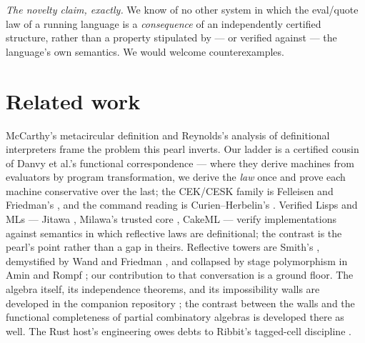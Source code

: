 \documentclass[acmsmall,screen,review]{acmart}
\begin{document}
\emph{The novelty claim, exactly.} We know of no other system in
which the eval/quote law of a running language is a
\emph{consequence} of an independently certified structure, rather
than a property stipulated by --- or verified against --- the
language's own semantics. We would welcome counterexamples.

\section{Related work}
\label{sec:related}

McCarthy's metacircular definition \cite{mccarthy60} and Reynolds's
analysis of definitional interpreters \cite{reynolds72} frame the
problem this pearl inverts. Our ladder is a certified cousin of
Danvy et al.'s functional correspondence \cite{ager03} --- where they
derive machines from evaluators by program transformation, we derive
the \emph{law} once and prove each machine conservative over the
last; the CEK/CESK family is Felleisen and Friedman's
\cite{felleisen86}, and the command reading is Curien--Herbelin's
\cite{curien00}. Verified Lisps and MLs --- Jitawa \cite{myreen11},
Milawa's trusted core \cite{davis15}, CakeML \cite{kumar14} ---
verify implementations against semantics in which reflective laws
are definitional; the contrast is the pearl's point rather than a
gap in theirs. Reflective towers are Smith's \cite{smith84}, demystified
by Wand and Friedman \cite{wand88}, and collapsed by stage
polymorphism in Amin and Rompf \cite{amin18}; our contribution to
that conversation is a ground floor. The algebra itself, its independence
theorems, and its impossibility walls are developed in the companion
repository \cite{artifact-lean}; the contrast between the walls and
the functional completeness of partial combinatory algebras
\cite{vanoosten08} is developed there as well. The Rust host's
engineering owes debts to Ribbit's tagged-cell discipline
\cite{yvon21}.
\end{document}

